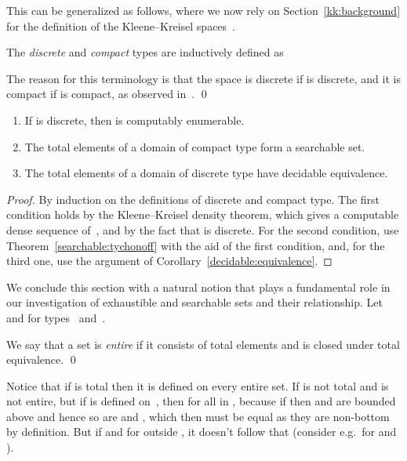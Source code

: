 \documentclass{LMCS}
\begin{document}
This can be generalized as follows, where we now rely on
Section~\ref{kk:background} for the definition of the Kleene--Kreisel
spaces~.  
\begin{defi} \label{discrete:compact}
The \emph{discrete} and \emph{compact}
types are inductively defined as
\newcommand{\discrete}{\mathtt{discrete}}
\newcommand{\compact}{\mathtt{compact}}

The reason for this terminology is that the space  is
discrete if  is discrete, and it is compact if  is
compact, as observed in~\cite{escardo:barbados}. \qed
\end{defi}
\pagebreak[3]
\begin{thm} \label{thm:discrete:compact}
\leavevmode
\begin{enumerate}
\item If  is discrete, then  is computably enumerable. 
\item The total elements of a domain of compact type form a searchable set.
\item The total elements of a domain of discrete type have decidable equivalence.
\end{enumerate}
\end{thm}
\begin{proof}
  By induction on the definitions of discrete and compact type.  The
  first condition holds by the Kleene--Kreisel density theorem, which
  gives a computable dense sequence of~, and by the fact
  that  is discrete.  For the second condition, use
  Theorem~\ref{searchable:tychonoff} with the aid of the first
  condition, and, for the third one, use the argument of
  Corollary~\ref{decidable:equivalence}.
\end{proof}

We conclude this section with a natural notion that plays a
fundamental role in our investigation of exhaustible and searchable
sets and their relationship. Let  and 
for types~ and~.
\begin{defi} \label{def:entire} We say that a set  is \emph{entire} if it consists of total elements and is
  closed under total equivalence. \qed
\end{defi}
Notice that if  is total then it is defined on every entire set.
If  is not total and  is not entire, but if  is defined
on~, then  for all  in , because if  then  and  are bounded above and hence so are 
and , which then must be equal as they are non-bottom by
definition.  But if  and  for  outside , it
doesn't follow that  (consider e.g.\  for  and ).
\end{document}
